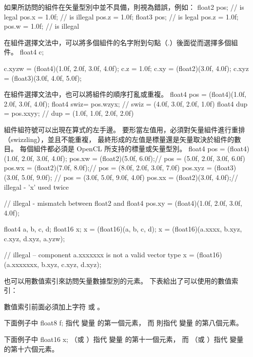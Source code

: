 如果所訪問的組件在矢量型別中並不具備，則視為錯誤，例如：
\startclc
float2 pos;	// is legal
pos.x = 1.0f;	// is illegal
pos.z = 1.0f;
float3 pos;	// is legal
pos.z = 1.0f;
pos.w = 1.0f;	// is illegal
\stopclc

在組件選擇文法中，可以將多個組件的名字附到句點（.）後面從而選擇多個組件。
\startclc
float4 c;

c.xyzw = (float4)(1.0f, 2.0f, 3.0f, 4.0f);
c.z = 1.0f;
c.xy = (float2)(3.0f, 4.0f);
c.xyz = (float3)(3.0f, 4.0f, 5.0f);
\stopclc

在組件選擇文法中，也可以將組件的順序打亂或重複。
\startclc
float4 pos = (float4)(1.0f, 2.0f, 3.0f, 4.0f);
float4 swiz= pos.wzyx; // swiz = (4.0f, 3.0f, 2.0f, 1.0f)
float4 dup = pos.xxyy; // dup = (1.0f, 1.0f, 2.0f, 2.0f)
\stopclc

組件組符號可以出現在算式的左手邊。
要形當左值用，必須對矢量組件進行重排（swizzling），並且不能重複，
最終形成的左值是標量還是矢量取決於組件的數目。
每個組件都必須是 OpenCL 所支持的標量或矢量型別。
\startclc
float4 pos = (float4)(1.0f, 2.0f, 3.0f, 4.0f);
pos.xw = (float2)(5.0f, 6.0f);// pos = (5.0f, 2.0f, 3.0f, 6.0f)
pos.wx = (float2)(7.0f, 8.0f);// pos = (8.0f, 2.0f, 3.0f, 7.0f)
pos.xyz = (float3)(3.0f, 5.0f, 9.0f); // pos = (3.0f, 5.0f, 9.0f, 4.0f)
pos.xx = (float2)(3.0f, 4.0f);// illegal - 'x' used twice

// illegal - mismatch between float2 and float4
pos.xy = (float4)(1.0f, 2.0f, 3.0f, 4.0f);

float4 a, b, c, d;
float16 x;
x = (float16)(a, b, c, d);
x = (float16)(a.xxxx, b.xyz, c.xyz, d.xyz, a.yzw);

// illegal – component a.xxxxxxx is not a valid vector type
x = (float16)(a.xxxxxxx, b.xyz, c.xyz, d.xyz);
\stopclc

也可以用數值索引來訪問矢量數據型別的元素。
下表給出了可以使用的數值索引：

{}

數值索引前面必須加上字符  或 。

下面例子中
\startclc
float8	f;
\stopclc
{} 指代  變量  的第一個元素，
而  則指代  變量  的第八個元素。

下面例子中
\startclc
float16	x;
\stopclc
{} （或 ）指代  變量  的第十一個元素，
而  （或 ）指代  變量  的第十六個元素。

